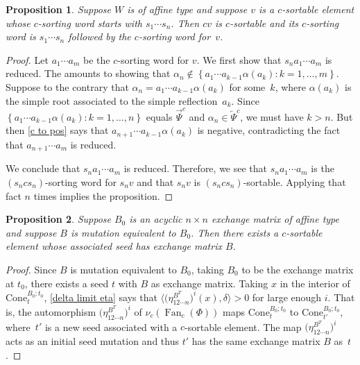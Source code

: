 \documentclass{amsart}
\newtheorem{proposition}{Proposition}[section]
\theoremstyle{definition}
\theoremstyle{remark}
\numberwithin{equation}{section}
\newcommand{\set}[1]{{\left\lbrace #1 \right\rbrace}}
\newcommand{\br}[1]{{\langle #1 \rangle}}
\newcommand{\0}{{\mathbf{0}}}
\newcommand{\Cone}{\mathrm{Cone}}
\newcommand{\Fan}{\operatorname{Fan}}
\newcommand{\RSChar}{\Phi}
\newcommand{\RS}{\RSChar}
\newcommand{\TravInfChar}{\Psi}
\newcommand{\TravProj}[1]{\overrightarrow{\TravInfChar}^{#1}}
\newcommand{\TravInj}[1]{\overleftarrow{\TravInfChar}^{#1}}
\begin{document}
\begin{proposition}\label{tack on c}
Suppose $W$ is of affine type and suppose $v$ is a $c$-sortable element whose $c$-sorting word starts with $s_1\cdots s_n$.
Then $cv$ is $c$-sortable and its $c$-sorting word is $s_1\cdots s_n$ followed by the $c$-sorting word for~$v$.
\end{proposition}
\begin{proof}
Let $a_1\cdots a_m$ be the $c$-sorting word for $v$.
We first show that $s_na_1\cdots a_m$ is reduced.
The amounts to showing that $\alpha_n\not\in\set{a_1\cdots a_{k-1}\alpha(a_k):k=1,\ldots,m}$.
Suppose to the contrary that $\alpha_n=a_1\cdots a_{k-1}\alpha(a_k)$ for some~$k$, where $\alpha(a_k)$ is the simple root associated to the simple reflection~$a_k$.
Since $\set{a_1\cdots a_{k-1}\alpha(a_k):k=1,\ldots,n}$ equals $\TravProj{c}$ and $\alpha_n\in \TravInj{c}$, we must have $k>n$.
But then \cref{c to pos} says that $a_{n+1}\cdots a_{k-1}\alpha(a_k)$ is negative, contradicting the fact that $a_{n+1}\cdots a_m$ is reduced.

We conclude that $s_na_1\cdots a_m$ is reduced.
Therefore, we see that $s_na_1\cdots a_m$ is the $(s_ncs_n)$-sorting word for $s_nv$ and that $s_nv$ is $(s_ncs_n)$-sortable.
Applying that fact $n$ times implies the proposition.
\end{proof}

\begin{proposition}\label{any B is sort}
Suppose $B_0$ is an acyclic $n\times n$ exchange matrix of affine type and suppose $B$ is mutation equivalent to $B_0$.
Then there exists a $c$-sortable element whose associated seed has exchange matrix $B$.
\end{proposition}
\begin{proof}
Since $B$ is mutation equivalent to $B_0$, taking $B_0$ to be the exchange matrix at $t_0$, there exists a seed $t$ with $B$ as exchange matrix.
Taking $x$ in the interior of $\Cone^{B_0;t_0}_t$, \cref{delta limit eta} says that $\br{\bigl(\eta_{12\cdots n}^{B^T}\bigr)^i(x),\delta}>0$  for large enough $i$.
That is, the automorphism $\bigl(\eta_{12\cdots n}^{B^T}\bigr)^i$ of $\nu_c(\Fan_c(\RS))$ maps $\Cone^{B_0;t_0}_t$ to $\Cone^{B_0;t_0}_{t'}$, where~$t'$ is a new seed associated with a $c$-sortable element.
The map $\bigl(\eta_{12\cdots n}^{B^T}\bigr)^i$ acts as an initial seed mutation and thus $t'$ has the same exchange matrix $B$ as~$t$.
\end{proof}
\end{document}
